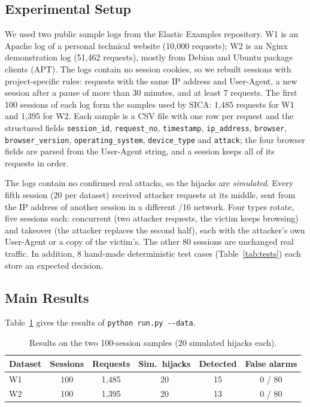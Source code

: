 \documentclass[conference]{IEEEtran}
\begin{document}
\subsection{Experimental Setup}

We used two public sample logs from the Elastic Examples repository. W1 is an
Apache log of a personal technical website (10,000 requests); W2 is an Nginx
demonstration log (51,462 requests), mostly from Debian and Ubuntu package
clients (APT). The logs contain no session cookies, so we rebuilt sessions with
project-specific rules: requests with the same IP address and User-Agent, a new
session after a pause of more than 30 minutes, and at least 7 requests. The
first 100 sessions of each log form the samples used by SICA: 1,485 requests
for W1 and 1,395 for W2. Each sample is a CSV file with one row per request and
the structured fields \texttt{session\_id}, \texttt{request\_no},
\texttt{timestamp}, \texttt{ip\_address}, \texttt{browser},
\texttt{browser\_version}, \texttt{operating\_system},
\texttt{device\_type} and \texttt{attack}; the four browser fields are parsed
from the User-Agent string, and a session keeps all of its requests in order.

The logs contain no confirmed real attacks, so the hijacks are \emph{simulated}.
Every fifth session (20 per dataset) received attacker requests at its middle,
sent from the IP address of another session in a different /16 network. Four
types rotate, five sessions each: concurrent (two attacker requests, the victim
keeps browsing) and takeover (the attacker replaces the second half), each with
the attacker's own User-Agent or a copy of the victim's. The other 80 sessions
are unchanged real traffic. In addition, 8 hand-made deterministic test cases
(Table~\ref{tab:tests}) each store an expected decision.

\subsection{Main Results}

Table~\ref{tab:results} gives the results of \texttt{python run.py -{}-data}.

\begin{table}[t]
\centering
\caption{Results on the two 100-session samples (20 simulated hijacks each).}
\label{tab:results}
\footnotesize
\setlength{\tabcolsep}{3.4pt}
\begin{tabular}{@{}lccccc@{}}
\toprule
Dataset & Sessions & Requests & Sim.\ hijacks & Detected & False alarms \\
\midrule
W1 & 100 & 1,485 & 20 & 15 & 0 / 80 \\
W2 & 100 & 1,395 & 20 & 13 & 0 / 80 \\
\bottomrule
\end{tabular}
\end{table}
\end{document}
